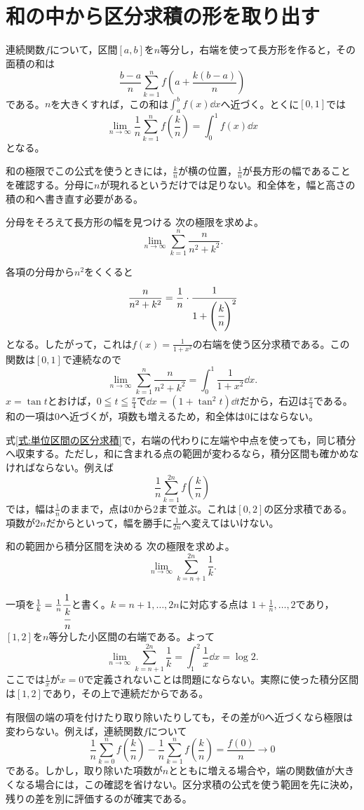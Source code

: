 \section{和の中から区分求積の形を取り出す}\label{節:和の区分求積}

連続関数$f$について，区間$[a,b]$を$n$等分し，右端を使って長方形を作ると，その面積の和は
\[
 \frac{b-a}{n}\sum_{k=1}^{n}
 f\left(a+\frac{k(b-a)}{n}\right)
\]
である。$n$を大きくすれば，この和は$\int_a^b f(x)\dd x$へ近づく。とくに$[0,1]$では
\begin{equation}\label{式:単位区間の区分求積}
 \lim_{n\to\infty}\frac1n\sum_{k=1}^{n}f\left(\frac{k}{n}\right)
 =\int_0^1 f(x)\dd x
\end{equation}
となる。

和の極限でこの公式を使うときには，$\frac{k}{n}$が横の位置，$\frac1n$が長方形の幅であることを確認する。分母に$n$が現れるというだけでは足りない。和全体を，幅と高さの積の和へ書き直す必要がある。

\begin{example}{分母をそろえて長方形の幅を見つける}
次の極限を求めよ。
\[
 \lim_{n\to\infty}\sum_{k=1}^{n}\frac{n}{n^2+k^2}.
\]
\end{example}

各項の分母から$n^2$をくくると
\[
 \frac{n}{n^2+k^2}
 =\frac1n\cdot\cfrac{1}{1+\left(\cfrac{k}{n}\right)^2}
\]
となる。したがって，これは$f(x)=\frac1{1+x^2}$の右端を使う区分求積である。この関数は$[0,1]$で連続なので
\[
 \lim_{n\to\infty}\sum_{k=1}^{n}\frac{n}{n^2+k^2}
 =\int_0^1\frac{1}{1+x^2}\dd x.
\]
$x=\tan t$とおけば，$0\leqq t\leqq\frac{\pi}{4}$で$\dd x=(1+\tan^2t)\dd t$だから，右辺は$\frac{\pi}{4}$である。和の一項は$0$へ近づくが，項数も増えるため，和全体は$0$にはならない。

式\eqref{式:単位区間の区分求積}で，右端の代わりに左端や中点を使っても，同じ積分へ収束する。ただし，和に含まれる点の範囲が変わるなら，積分区間も確かめなければならない。例えば
\[
 \frac1n\sum_{k=1}^{2n}f\left(\frac{k}{n}\right)
\]
では，幅は$\frac1n$のままで，点は$0$から$2$まで並ぶ。これは$[0,2]$の区分求積である。項数が$2n$だからといって，幅を勝手に$\frac1{2n}$へ変えてはいけない。

\begin{example}{和の範囲から積分区間を決める}
次の極限を求めよ。
\[
 \lim_{n\to\infty}\sum_{k=n+1}^{2n}\frac1k.
\]
\end{example}

一項を$\frac1k=\frac1n\cfrac1{\cfrac{k}{n}}$と書く。$k=n+1,\ldots,2n$に対応する点は
$1+\frac1n,\ldots,2$であり，$[1,2]$を$n$等分した小区間の右端である。よって
\[
 \lim_{n\to\infty}\sum_{k=n+1}^{2n}\frac1k
 =\int_1^2\frac1x\dd x=\log2.
\]
ここでは$\frac1x$が$x=0$で定義されないことは問題にならない。実際に使った積分区間は$[1,2]$であり，その上で連続だからである。

有限個の端の項を付けたり取り除いたりしても，その差が$0$へ近づくなら極限は変わらない。例えば，連続関数$f$について
\[
 \frac1n\sum_{k=0}^{n}f\left(\frac{k}{n}\right)
 -\frac1n\sum_{k=1}^{n}f\left(\frac{k}{n}\right)
 =\frac{f(0)}n\longrightarrow0
\]
である。しかし，取り除いた項数が$n$とともに増える場合や，端の関数値が大きくなる場合には，この確認を省けない。区分求積の公式を使う範囲を先に決め，残りの差を別に評価するのが確実である。

